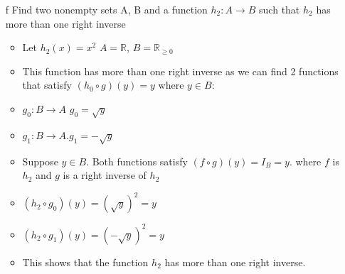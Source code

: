 \documentclass{article}
\begin{document}
\begin{enumerate}
\begin{itemize}
    \end{itemize}
    \item [f] Find two nonempty sets A, B and a function $h_2 : A \rightarrow B$ such that $h_2$ has more than
    one right inverse \begin{itemize}
        \item Let $h_2(x) = x^2$ $A = \mathbb{R}$, $ B =\mathbb{R}_{\geq 0} $
        \item This function has more than one right inverse as we can find 2 functions that satisfy $(h_0 \circ g )(y) = y $ where $y \in B$: 
        \item $g_0: B \rightarrow A$ $g_0 = \sqrt{y}$ 
        \item $g_1: B \rightarrow A. g_1 = -\sqrt{y}$ 
        \item Suppose $y \in B$. Both functions satisfy $(f \circ g )(y) = I_B = y $. where $f$ is $h_2$ and $g$ is a right inverse of $h_2$
        \item $(h_2 \circ g_0)(y) = (\sqrt{y})^2 = y$ 
        \item $(h_2 \circ g_1)(y) = (-\sqrt{y})^2 = y$
        \item This shows that the function $h_2$ has more than one right inverse.
    \end{itemize}
\end{enumerate}
\end{document}
